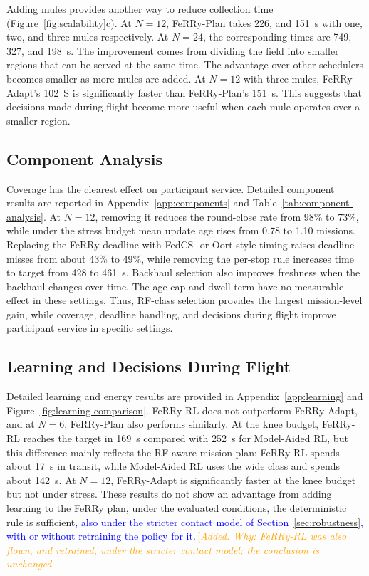 \documentclass[conference]{IEEEtran}
\newcommand{\sysname}{FeRRy}
\newcommand{\changenote}[1]{\textcolor{orange}{\,[\emph{#1}]}}
\begin{document}
Adding mules provides another way to reduce collection time
(Figure~\ref{fig:scalability}c). At \(N=12\), \sysname{}-Plan takes 226, and 151~s with one, two, and three mules respectively. At
\(N=24\), the corresponding times are 749, 327, and 198~s. The improvement
comes from dividing the field into smaller regions that can be served at the
same time. The advantage over other schedulers becomes smaller as more mules
are added. At \(N=12\) with three mules, \sysname{}-Adapt's 102~S is significantly
faster than \sysname{}-Plan's 151~s. This suggests that decisions made during
flight become more useful when each mule operates over a smaller region.

\subsection{Component Analysis}
\label{sec:components}

Coverage has the clearest
effect on participant service. Detailed component results are reported in
Appendix~\ref{app:components} and Table~\ref{tab:component-analysis}.
At \(N=12\), removing it reduces the round-close rate from 98\% to 73\%, while under
the stress budget mean update age rises from 0.78 to 1.10 missions.
Replacing the \sysname{} deadline with FedCS- or Oort-style timing raises
deadline misses from about 43\% to 49\%, while removing the per-stop rule
increases time to target from 428 to 461~s. Backhaul selection also improves
freshness when the backhaul changes over time. The age cap and dwell term have
no measurable effect in these settings. Thus, RF-class selection provides
the largest mission-level gain, while coverage, deadline handling, and
decisions during flight improve participant service in specific settings.

\subsection{Learning and Decisions During Flight}
\label{sec:learning}

Detailed learning and energy results are provided in
Appendix~\ref{app:learning} and Figure~\ref{fig:learning-comparison}.
\sysname{}-RL does not outperform \sysname{}-Adapt, and at \(N=6\),
\sysname{}-Plan also performs similarly. At the knee budget,
\sysname{}-RL reaches the target in 169~s compared with 252~s for
Model-Aided RL, but this difference mainly reflects the RF-aware mission plan:
\sysname{}-RL spends about 17~s in transit, while Model-Aided RL uses the wide
class and spends about 142~s. At \(N=12\), \sysname{}-Adapt is significantly
faster at the knee budget but not under stress. These results do not show an
advantage from adding learning to the \sysname{} plan, under the evaluated
conditions, the deterministic rule is sufficient\textcolor{blue}{, also under the
stricter contact model of Section~\ref{sec:robustness}, with or without
retraining the policy for it}.\changenote{Added. Why: \sysname{}-RL was also flown, and retrained, under the stricter contact model; the conclusion is unchanged.}
\end{document}
